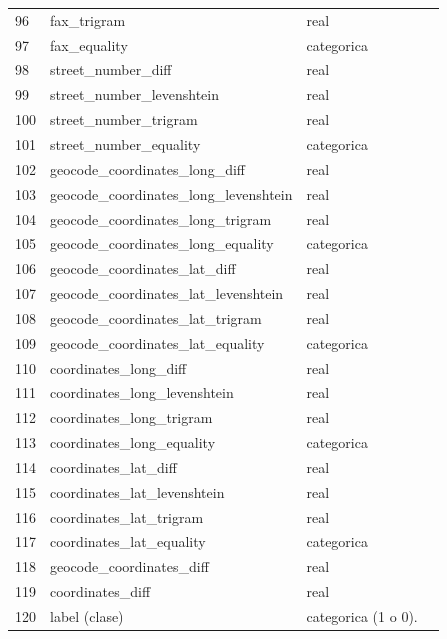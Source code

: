 \documentclass[journal]{IEEEtran}
\begin{document}
\begin{table}[ht!]
\begin{tabular}{l | l l l}
96	& fax\_trigram  &   real  \\
97	& fax\_equality  &    categorica   \\
98	& street\_number\_diff  &   real  \\
99	& street\_number\_levenshtein  &   real  \\
100	& street\_number\_trigram  &   real  \\
101	& street\_number\_equality  &    categorica   \\
102	& geocode\_coordinates\_long\_diff  &   real  \\
103	& geocode\_coordinates\_long\_levenshtein  &   real  \\
104	& geocode\_coordinates\_long\_trigram  &   real  \\
105	& geocode\_coordinates\_long\_equality  &    categorica   \\
106	& geocode\_coordinates\_lat\_diff  &   real  \\
107	& geocode\_coordinates\_lat\_levenshtein  &   real  \\
108	& geocode\_coordinates\_lat\_trigram  &   real  \\
109	& geocode\_coordinates\_lat\_equality  &    categorica   \\
110	& coordinates\_long\_diff  &   real  \\
111	& coordinates\_long\_levenshtein  &   real  \\
112	& coordinates\_long\_trigram  &   real  \\
113	& coordinates\_long\_equality  &    categorica   \\
114	& coordinates\_lat\_diff  &   real  \\
115	& coordinates\_lat\_levenshtein  &   real  \\
116	& coordinates\_lat\_trigram  &   real  \\
117	& coordinates\_lat\_equality  &    categorica   \\
118	& geocode\_coordinates\_diff  &   real  \\
119	& coordinates\_diff  &   real  \\
120	& label (clase) & categorica (1 o 0). \\
\end{tabular}
\end{table}
\end{document}
